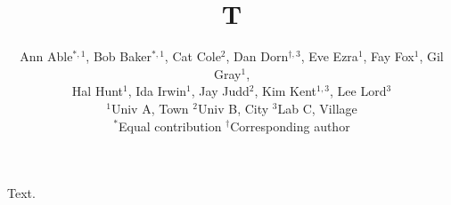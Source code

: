 \documentclass{article}
\title{T}
\author{Ann Able$^{\ast,1}$, Bob Baker$^{\ast,1}$, Cat Cole$^{2}$, Dan Dorn$^{\dagger,3}$, Eve Ezra$^{1}$, Fay Fox$^{1}$, Gil Gray$^{1}$,\\
Hal Hunt$^{1}$, Ida Irwin$^{1}$, Jay Judd$^{2}$, Kim Kent$^{1,3}$, Lee Lord$^{3}$\\
$^{1}$Univ A, Town \quad $^{2}$Univ B, City \quad $^{3}$Lab C, Village\\
$^{\ast}$Equal contribution \quad $^{\dagger}$Corresponding author}
\date{}
\begin{document}
\maketitle
Text.
\end{document}
